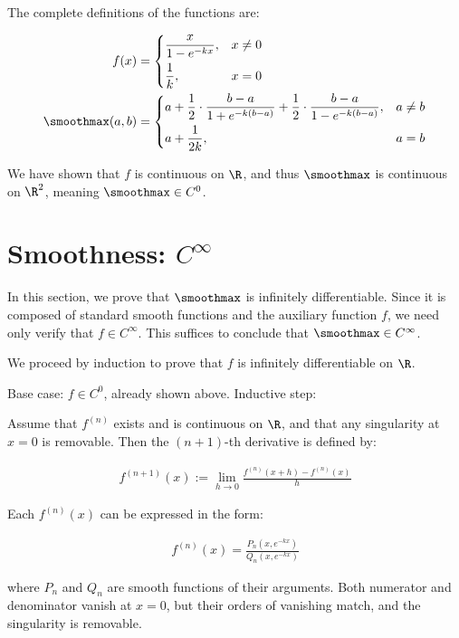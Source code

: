 The complete definitions of the functions are:

\begin{align}
    f(x) &= \begin{dcases}
        \frac{x}{1 - e^{-kx}}, & x \neq 0 \\
        \frac{1}{k}, & x = 0
    \end{dcases} \\
    \smoothmax(a, b) &= \begin{dcases}
        a + \frac{1}{2} \cdot \frac{b - a}{1 + e^{-k(b - a)}} + \frac{1}{2} \cdot \frac{b - a}{1 - e^{-k(b - a)}}, & a \neq b \\
        a + \frac{1}{2k}, & a = b
    \end{dcases}
\end{align}

We have shown that $f$ is continuous on $\R$, and thus $\smoothmax$ is continuous on $\R^2$, meaning $\smoothmax \in C^0$.

\section{Smoothness: $C^\infty$}

In this section, we prove that $\smoothmax$ is infinitely differentiable. Since it is composed of standard smooth functions and the auxiliary function $f$, we need only verify that $f \in C^\infty$. This suffices to conclude that $\smoothmax \in C^\infty$.

We proceed by induction to prove that $f$ is infinitely differentiable on $\R$.

\begin{Itemize}
    \Item{$\bullet$} Base case: $f \in C^0$, already shown above.
    \Item{$\bullet$} Inductive step:
    
    Assume that $f^{(n)}$ exists and is continuous on $\R$, and that any singularity at $x = 0$ is removable. Then the $(n+1)$-th derivative is defined by:
    
    \begin{align}
        f^{(n+1)}(x) := \lim_{h \to 0} \frac{f^{(n)}(x + h) - f^{(n)}(x)}{h}
    \end{align}
    
    Each $f^{(n)}(x)$ can be expressed in the form:
    
    \begin{align}
        f^{(n)}(x) = \frac{P_n(x, e^{-kx})}{Q_n(x, e^{-kx})}
    \end{align}
    
    where $P_n$ and $Q_n$ are smooth functions of their arguments. Both numerator and denominator vanish at $x = 0$, but their orders of vanishing match, and the singularity is removable.
\end{Itemize}

